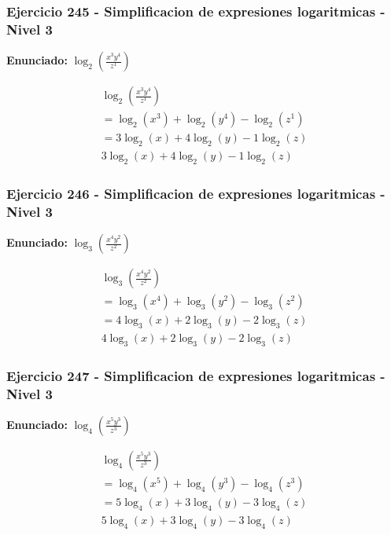 \documentclass[12pt,a4paper]{article}
\begin{document}
\subsubsection*{Ejercicio 245 - Simplificacion de expresiones logaritmicas - Nivel 3}
\textbf{Enunciado:} \(\log_{2}\left(\frac{x^{3}y^{4}}{z^{1}}\right)\)

\[
\begin{aligned}
\log_{2}\left(\frac{x^{3}y^{4}}{z^{1}}\right)\\
=\log_{2}\left(x^{3}\right)+\log_{2}\left(y^{4}\right)-\log_{2}\left(z^{1}\right)\\
=3\log_{2}\left(x\right)+4\log_{2}\left(y\right)-1\log_{2}\left(z\right)\\
\boxed{3\log_{2}\left(x\right)+4\log_{2}\left(y\right)-1\log_{2}\left(z\right)}
\end{aligned}
\]


\subsubsection*{Ejercicio 246 - Simplificacion de expresiones logaritmicas - Nivel 3}
\textbf{Enunciado:} \(\log_{3}\left(\frac{x^{4}y^{2}}{z^{2}}\right)\)

\[
\begin{aligned}
\log_{3}\left(\frac{x^{4}y^{2}}{z^{2}}\right)\\
=\log_{3}\left(x^{4}\right)+\log_{3}\left(y^{2}\right)-\log_{3}\left(z^{2}\right)\\
=4\log_{3}\left(x\right)+2\log_{3}\left(y\right)-2\log_{3}\left(z\right)\\
\boxed{4\log_{3}\left(x\right)+2\log_{3}\left(y\right)-2\log_{3}\left(z\right)}
\end{aligned}
\]


\subsubsection*{Ejercicio 247 - Simplificacion de expresiones logaritmicas - Nivel 3}
\textbf{Enunciado:} \(\log_{4}\left(\frac{x^{5}y^{3}}{z^{3}}\right)\)

\[
\begin{aligned}
\log_{4}\left(\frac{x^{5}y^{3}}{z^{3}}\right)\\
=\log_{4}\left(x^{5}\right)+\log_{4}\left(y^{3}\right)-\log_{4}\left(z^{3}\right)\\
=5\log_{4}\left(x\right)+3\log_{4}\left(y\right)-3\log_{4}\left(z\right)\\
\boxed{5\log_{4}\left(x\right)+3\log_{4}\left(y\right)-3\log_{4}\left(z\right)}
\end{aligned}
\]
\end{document}
